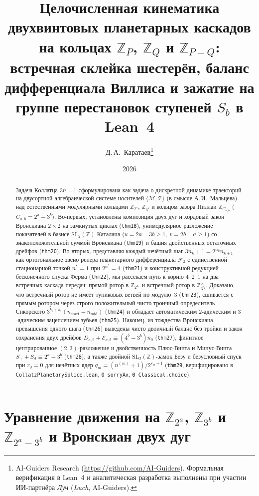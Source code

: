 \documentclass[11pt,a4paper]{article}
\title{\textbf{Целочисленная кинематика двухвинтовых планетарных каскадов на кольцах $\mathbb{Z}_{P}$, $\mathbb{Z}_{Q}$ и $\mathbb{Z}_{P - Q}$:\\ встречная склейка шестерён, баланс дифференциала Виллиса и зажатие на группе перестановок ступеней $S_b$ в Lean~4}}
\author{Д.\,А.~Каратаев\thanks{AI-Guiders Research (\url{https://github.com/AI-Guiders}). Формальная верификация в Lean~4 и аналитическая разработка выполнены при участии ИИ-партнёра \emph{Луч} (\emph{Luch}, AI-Guiders).}}
\date{2026}
\theoremstyle{definition}
\theoremstyle{remark}
\begin{document}
\maketitle

\begin{abstract}
Задача Коллатца $3n+1$ сформулирована как задача о дискретной динамике траекторий на двусортной алгебраической системе носителей $\langle\mathcal{M},\mathcal{T}\rangle$ (в смысле А.\,И.~Мальцева) над естественными модулярными кольцами $\mathbb{Z}_{2^a}$, $\mathbb{Z}_{3^b}$ и кольцом зазора Пиллаи $\mathbb{Z}_{C_{a,b}}$ ($C_{a,b} = 2^a - 3^b$). Во-первых, установлены композиция двух дуг и хордовый закон Вронскиана $2\times 2$ на замкнутых циклах (\texttt{thm18}), унимодулярное разложение показателей в базисе $\mathrm{SL}_2(\mathbb{Z})$ Каталана ($u = 2a - 3b \ge 1,\ v = 2b - a \ge 1$) со знакоположительной суммой Вронскиана (\texttt{thm19}) и башня двойственных остаточных дрейфов (\texttt{thm20}). Во-вторых, представляя каждый нечётный шаг $3 n_k + 1 = 2^{\alpha_k} n_{k+1}$ как ортогональное звено репера планетарного дифференциала $\mathcal{F}_3$ с единственной стационарной точкой $n^* = 1$ при $2^{\alpha^*} = 4$ (\texttt{thm21}) и конструктивной редукцией бесконечного спуска Ферма (\texttt{thm22}), мы рассекаем путь к корню $4\text{--}2\text{--}1$ на два встречных каскада передач: прямой ротор в $\mathbb{Z}_{2^{a_1}}$ и встречный ротор в $\mathbb{Z}_{3^{b_2}}^\times$. Доказано, что встречный ротор не имеет тупиковых ветвей по модулю~$3$ (\texttt{thm23}), сшивается с прямым ротором через строго положительный чисто троичный определитель Сикорского $3^{b_1+b_2}(n_{\mathrm{start}} - n_{\mathrm{mid}})$ (\texttt{thm24}) и обладает автоматическим $2$-адическим и $3$-адическим зацеплением зубьев (\texttt{thm25}). Наконец, из тождества Вронскиана превышения одного шага (\texttt{thm26}) выведены чисто двоичный баланс без тройки и закон сохранения двух дрейфов $D_{a,b} + \mathcal{E}_{a,b} \equiv (4^b - 3^b) n_0$ (\texttt{thm27}), финитное центрированное $(2,3)$-разложение и двойственность Плюс-Винта и Минус-Винта $S_+ + S_d \equiv 2^a - 3^b$ (\texttt{thm28}), а также двойной $\mathrm{SL}_2(\mathbb{Z})$-замок Безу и безусловный спуск при $r_0 = 0$ для нечётных ядер $q_m = (n^{(m)} + 1)/2^{r_m + 1}$ (\texttt{thm29}, верифицировано в \texttt{CollatzPlanetarySplice.lean}, \texttt{0 sorryAx}, \texttt{0 Classical.choice}).
\end{abstract}

\section{Уравнение движения на $\mathbb{Z}_{2^a}$, $\mathbb{Z}_{3^b}$ и $\mathbb{Z}_{2^a - 3^b}$ и Вронскиан двух дуг}
\label{sec:two-arc-wronskian}
\end{document}
